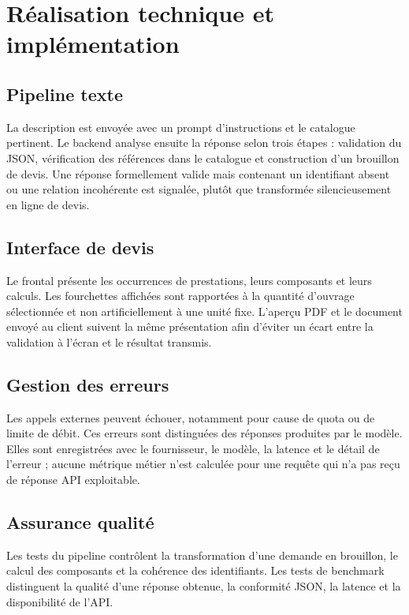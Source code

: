 \section{Réalisation technique et implémentation}
\subsection{Pipeline texte}
La description est envoyée avec un prompt d'instructions et le catalogue pertinent. Le backend analyse ensuite la réponse selon trois étapes : validation du JSON, vérification des références dans le catalogue et construction d'un brouillon de devis. Une réponse formellement valide mais contenant un identifiant absent ou une relation incohérente est signalée, plutôt que transformée silencieusement en ligne de devis.

\subsection{Interface de devis}
Le frontal présente les occurrences de prestations, leurs composants et leurs calculs. Les fourchettes affichées sont rapportées à la quantité d'ouvrage sélectionnée et non artificiellement à une unité fixe. L'aperçu PDF et le document envoyé au client suivent la même présentation afin d'éviter un écart entre la validation à l'écran et le résultat transmis.

\subsection{Gestion des erreurs}
Les appels externes peuvent échouer, notamment pour cause de quota ou de limite de débit. Ces erreurs sont distinguées des réponses produites par le modèle. Elles sont enregistrées avec le fournisseur, le modèle, la latence et le détail de l'erreur ; aucune métrique métier n'est calculée pour une requête qui n'a pas reçu de réponse API exploitable.

\subsection{Assurance qualité}
Les tests du pipeline contrôlent la transformation d'une demande en brouillon, le calcul des composants et la cohérence des identifiants. Les tests de benchmark distinguent la qualité d'une réponse obtenue, la conformité JSON, la latence et la disponibilité de l'API.
